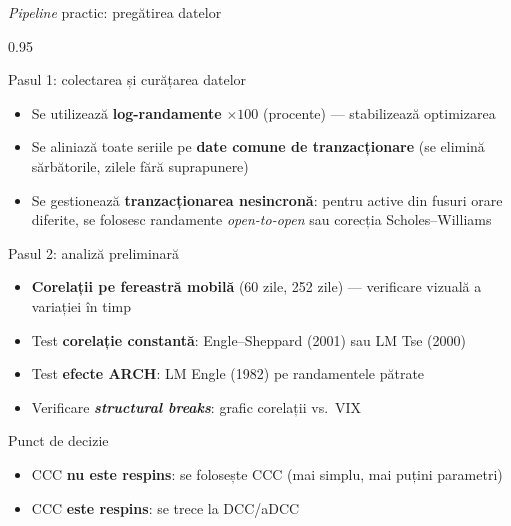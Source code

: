 \documentclass[9pt, aspectratio=169, t]{beamer}
\begin{document}
\begin{frame}{\textit{Pipeline} practic: pregătirea datelor}
    \begin{cminipage}{0.95\textwidth}
    {\scriptsize
    \begin{block}{Pasul 1: colectarea și curățarea datelor}
        \begin{itemize}\setlength{\itemsep}{0pt}
            \item Se utilizează \textbf{log-randamente} $\times 100$ (procente) --- stabilizează optimizarea
            \item Se aliniază toate seriile pe \textbf{date comune de tranzacționare} (se elimină sărbătorile, zilele fără suprapunere)
            \item Se gestionează \textbf{tranzacționarea nesincronă}: pentru active din fusuri orare diferite, se folosesc randamente \textit{open-to-open} sau corecția Scholes--Williams
        \end{itemize}
    \end{block}
    \vspace{-1mm}
    \begin{block}{Pasul 2: analiză preliminară}
        \begin{itemize}\setlength{\itemsep}{0pt}
            \item \textbf{Corelații pe fereastră mobilă} (60 zile, 252 zile) --- verificare vizuală a variației în timp
            \item Test \textbf{corelație constantă}: Engle--Sheppard (2001) sau LM Tse (2000)
            \item Test \textbf{efecte ARCH}: LM Engle (1982) pe randamentele pătrate
            \item Verificare \textbf{\textit{structural breaks}}: grafic corelații vs.\ VIX
        \end{itemize}
    \end{block}
    \vspace{-1mm}
    \begin{alertblock}{Punct de decizie}
        \begin{itemize}\setlength{\itemsep}{0pt}
            \item CCC \textbf{nu este respins}: se folosește CCC (mai simplu, mai puțini parametri)
            \item CCC \textbf{este respins}: se trece la DCC/aDCC
        \end{itemize}
    \end{alertblock}
    }
    \end{cminipage}
\end{frame}
\end{document}
